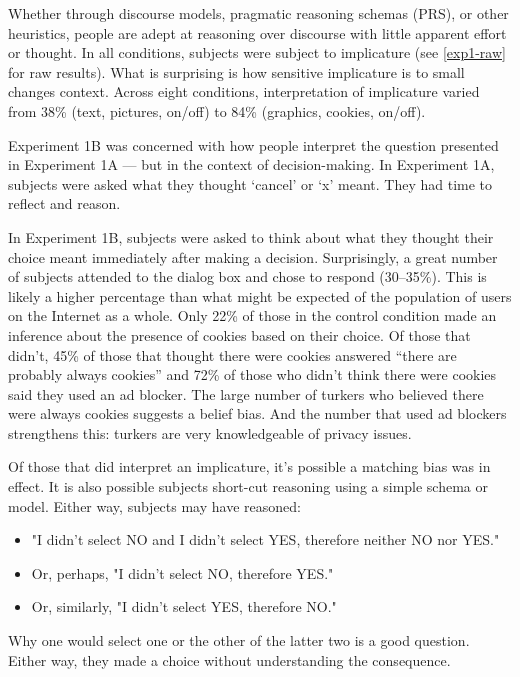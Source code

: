 Whether through discourse models, pragmatic reasoning schemas (PRS), or other heuristics, people are adept at reasoning over discourse with little apparent effort or thought. In all conditions, subjects were subject to implicature (see  \autoref{exp1-raw}  for raw results). What is surprising is how sensitive implicature is to small changes context. Across eight conditions, interpretation of implicature varied from 38\% (text, pictures, on\slash off) to 84\% (graphics, cookies, on\slash off). 

Experiment 1B was concerned with how people interpret the question presented in Experiment 1A --- but in the context of decision-making. In Experiment 1A, subjects were asked what they thought `cancel' or `x' meant. They had time to reflect and reason. 

In Experiment 1B, subjects were asked to think about what they thought their choice meant immediately after making a decision. Surprisingly, a great number of subjects attended to the dialog box and chose to respond (30--35\%). This is likely a higher percentage than what might be expected of the population of users on the Internet as a whole. Only 22\% of those in the control condition made an inference about the presence of cookies based on their choice. Of those that didn't, 45\% of those that thought there were cookies answered ``there are probably always cookies'' and 72\% of those who didn't think there were cookies said they used an ad blocker. The large number of turkers who believed there were always cookies suggests a belief bias. And the number that used ad blockers strengthens this: turkers are very knowledgeable of privacy issues.

Of those that did interpret an implicature, it's possible a matching bias was in effect. It is also possible subjects short-cut reasoning using a simple schema or model. Either way, subjects may have reasoned:

\begin{itemize}
\item "I didn't select NO and I didn't select YES, therefore neither NO nor YES." 
\item Or, perhaps, "I didn't select NO, therefore YES." 
\item Or, similarly, "I didn't select YES, therefore NO."
\end{itemize}

Why one would select one or the other of the latter two is a good question. Either way, they made a choice without understanding the consequence.

